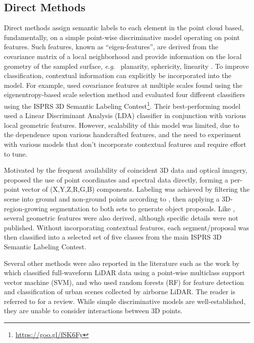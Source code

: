 \documentclass[final,3p,times,twocolumn,authoryear]{elsarticle}
\newcommand{\eg}{\textit{e}.\textit{g}.}
\begin{document}
\subsection{Direct Methods}
\label{sec:direct_methods}
Direct methods assign semantic labels to each element in the point cloud based, fundamentally, on a simple point-wise discriminative model operating on point features. Such features, known as ``eigen-features'', are derived from the covariance matrix of a local neighborhood and provide information on the local geometry of the sampled surface, \eg~ planarity, sphericity, linearity \citep{lin2014eigen}. 
To improve classification, contextual information can explicitly be incorporated into the model. 
For example, \citet{Blomley16} used covariance features at multiple scales found using the eigenentropy-based scale selection method \citep{weinnman2014} and evaluated four different classifiers using the ISPRS 3D Semantic Labeling Contest\footnote{\url{https://goo.gl/fSK6Fy}}.
Their best-performing model used a Linear Discriminant Analysis (LDA) classifier in conjunction with various local geometric features.
However, scalability of this model was limited, due to the dependence upon various handcrafted features, and the need to experiment with various models that don't incorporate contextual features and require effort to tune.  

Motivated by the frequent availability of coincident 3D data and optical imagery, \citet{ramiya2014semantic} proposed the use of point coordinates and spectral data directly, forming a per-point vector of (X,Y,Z,R,G,B) components. 
Labeling was achieved by filtering the scene into ground and non-ground points according to \citet{axelsson2000generation}, then applying a 3D-region-growing segmentation to both sets to generate object proposals. 
Like \citet{Blomley16}, several geometric features were also derived, although specific details were not published.
Without incorporating contextual features, each segment/proposal was then classified into a selected set of five classes from the main ISPRS 3D Semantic Labeling Contest. 
 
Several other methods were also reported in the literature such as the work by \citep{mallet2010} which classified full-waveform LiDAR data using a point-wise multiclass support vector machine (SVM), and \citep{Chehata09} who used random forests (RF) for feature detection and classification of urban scenes collected by airborne LiDAR.
The reader is referred to \citet{grilli2017review} for a review.
While simple discriminative models are well-established, they are unable to consider interactions between 3D points.
\end{document}
